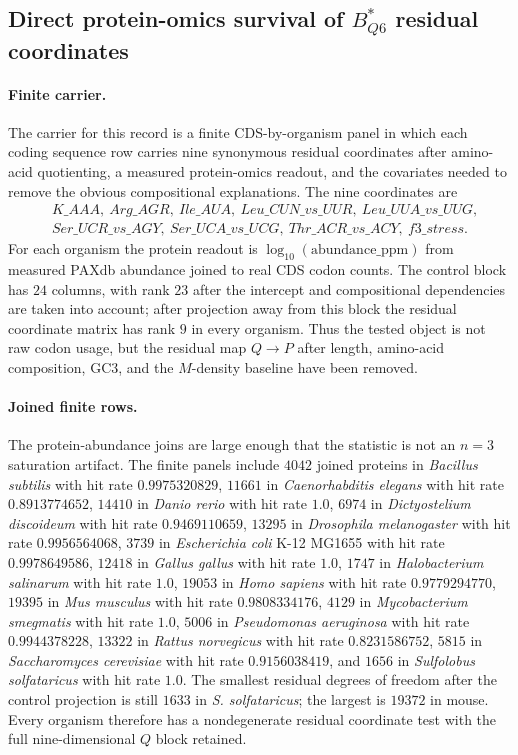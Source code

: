 \subsection{Direct protein-omics survival of $B^{\ast}_{Q6}$ residual coordinates}\label{sec:bioreality-q6-direct-protein-omics-survival}

\paragraph{Finite carrier.}
The carrier for this record is a finite CDS-by-organism panel in which each coding sequence row carries nine synonymous residual coordinates after amino-acid quotienting, a measured protein-omics readout, and the covariates needed to remove the obvious compositional explanations.  The nine coordinates are
$$
\begin{aligned}
&K\_AAA,\ Arg\_AGR,\ Ile\_AUA,\ Leu\_CUN\_vs\_UUR,\ Leu\_UUA\_vs\_UUG,\\
&Ser\_UCR\_vs\_AGY,\ Ser\_UCA\_vs\_UCG,\ Thr\_ACR\_vs\_ACY,\ f3\_stress.
\end{aligned}
$$
For each organism the protein readout is $\log_{10}(\mathrm{abundance\_ppm})$ from measured PAXdb abundance joined to real CDS codon counts.  The control block has $24$ columns, with rank $23$ after the intercept and compositional dependencies are taken into account; after projection away from this block the residual coordinate matrix has rank $9$ in every organism.  Thus the tested object is not raw codon usage, but the residual map $Q \to P$ after length, amino-acid composition, GC3, and the $M$-density baseline have been removed.

\paragraph{Joined finite rows.}
The protein-abundance joins are large enough that the statistic is not an $n=3$ saturation artifact.  The finite panels include $4042$ joined proteins in \emph{Bacillus subtilis} with hit rate $0.9975320829$, $11661$ in \emph{Caenorhabditis elegans} with hit rate $0.8913774652$, $14410$ in \emph{Danio rerio} with hit rate $1.0$, $6974$ in \emph{Dictyostelium discoideum} with hit rate $0.9469110659$, $13295$ in \emph{Drosophila melanogaster} with hit rate $0.9956564068$, $3739$ in \emph{Escherichia coli} K-12 MG1655 with hit rate $0.9978649586$, $12418$ in \emph{Gallus gallus} with hit rate $1.0$, $1747$ in \emph{Halobacterium salinarum} with hit rate $1.0$, $19053$ in \emph{Homo sapiens} with hit rate $0.9779294770$, $19395$ in \emph{Mus musculus} with hit rate $0.9808334176$, $4129$ in \emph{Mycobacterium smegmatis} with hit rate $1.0$, $5006$ in \emph{Pseudomonas aeruginosa} with hit rate $0.9944378228$, $13322$ in \emph{Rattus norvegicus} with hit rate $0.8231586752$, $5815$ in \emph{Saccharomyces cerevisiae} with hit rate $0.9156038419$, and $1656$ in \emph{Sulfolobus solfataricus} with hit rate $1.0$.  The smallest residual degrees of freedom after the control projection is still $1633$ in \emph{S. solfataricus}; the largest is $19372$ in mouse.  Every organism therefore has a nondegenerate residual coordinate test with the full nine-dimensional $Q$ block retained.

